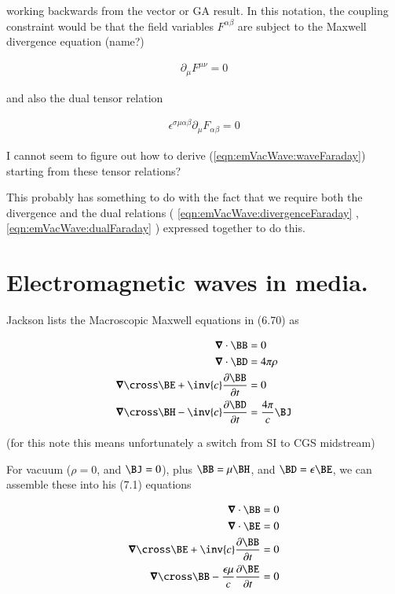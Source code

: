 working backwards from the vector or GA result.  In this notation, the coupling constraint would be that the field variables $F^{\alpha\beta}$ are subject to the Maxwell divergence equation (name?)

\begin{align}\label{eqn:emVacWave:divergenceFaraday}
\partial_\mu F^{\mu\nu} = 0
\end{align}

and also the dual tensor relation

\begin{align}\label{eqn:emVacWave:dualFaraday}
\epsilon^{\sigma\mu\alpha\beta} \partial_\mu F_{\alpha\beta} = 0
\end{align}

I cannot seem to figure out how to derive (\ref{eqn:emVacWave:waveFaraday}) starting from these tensor relations?

This probably has something to do with the fact that we require both the divergence and the dual relations 
(
\ref{eqn:emVacWave:divergenceFaraday}
,
\ref{eqn:emVacWave:dualFaraday}
)
expressed together to do this.

\section{Electromagnetic waves in media.}

Jackson lists the Macroscopic Maxwell equations in (6.70) as 

\begin{align*}
\spacegrad \cdot \BB &= 0 \\
\spacegrad \cdot \BD &= 4 \pi \rho \\
\spacegrad \cross \BE + \inv{c}\PD{t}{\BB} &= 0 \\
\spacegrad \cross \BH - \inv{c}\PD{t}{\BD} &= \frac{4 \pi}{c} \BJ  \\
\end{align*}

(for this note this means unfortunately a switch from SI to CGS midstream)

For vacuum ($\rho =0$, and $\BJ =0$), plus $\BB = \mu \BH$, and $\BD = \epsilon \BE$, we can assemble these into his (7.1) equations

\begin{align*}
\spacegrad \cdot \BB &= 0 \\
\spacegrad \cdot \BE &= 0 \\
\spacegrad \cross \BE + \inv{c}\PD{t}{\BB} &= 0 \\
\spacegrad \cross \BB - \frac{\epsilon \mu}{c}\PD{t}{\BE} &= 0  \\
\end{align*}

